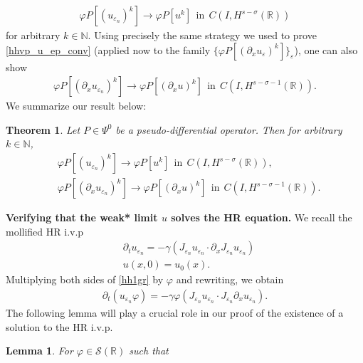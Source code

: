 \documentclass[12pt,reqno]{amsart}
\newcommand{\rr}{\mathbb{R}}
\newcommand{\p}{\partial}
\newcommand{\ee}{\varepsilon}
\newcommand{\vp}{\varphi}
\theoremstyle{plain}  %
\newtheorem{theorem}{Theorem}
\newtheorem{lemma}{Lemma}
\theoremstyle{definition}
\begin{document}
\begin{appendices}
\begin{equation}
\begin{split}
				\vp P [(u_{\ee_n})^k] \to \vp P [u^k] \ \ \text{in}  \ \ C(I,
				H^{s-\sigma}(\rr))
				\label{hhvp_u_ep_conv}
			\end{split}
		\end{equation}
		for arbitrary $k \in \mathbb{N}$.  Using precisely the same
		strategy we used to prove \eqref{hhvp_u_ep_conv} (applied now to
		the family $\{ \vp P [(\p_x u_{\ee})^k] \}_\ee$), one can also show
	\begin{equation}
			\begin{split}
			\vp P [ (\p_x u_{\ee_n})^k] \to \vp P [(\p_x u)^k] \ \ \text{in}  \ \ C(I,
				H^{s-\sigma -1 }(\rr)).
			\end{split}
		\end{equation}
		We summarize our result below:
		\begin{theorem}
		\label{hhthm:crit1}
		Let $P \in \Psi^0$ be a pseudo-differential operator. Then for
		arbitrary $k \in \mathbb{N}$, 
			\begin{equation}
			\begin{split}
				& \vp P [(u_{\ee_n})^k] \to \vp P [u^k] \ \ \text{in}  \ \ C(I,
				H^{s-\sigma }(\rr)),
				\\
				& 
				\vp P [(\p_x u_{\ee_n})^k] \to \vp P [(\p_x u)^k] \ \
				\text{in}  \ \ C(I,
				H^{s-\sigma -1}(\rr)).
				\label{hhdx_vp_u_ep_conv}
			\end{split}
		\end{equation}
	\end{theorem}
		\vskip0.1in
		{\bf Verifying that the weak* limit $u$ solves the HR equation.} 
		We recall the mollified HR i.v.p
		\begin{align}
			& \p_t u_{\ee_n}  = -\gamma(J_{\ee_n} u_{\ee_n} \cdot \p_x
			J_{\ee_n} u_{\ee_n})
			\label{hh1gr}
			\\
			& u(x,0) = u_0(x).
			\label{hh2gr}
		\end{align}
		Multiplying both sides of \eqref{hh1gr} by $\varphi$ and rewriting,
		we obtain
		\begin{equation}
			\label{hh3}
			\begin{split}
				\p_t(u_{\ee_n} \varphi) = -\gamma \vp (J_{\ee_n} u_{\ee_n} \cdot
				J_{\ee_n} \p_x u_{\ee_n}).
			\end{split}
		\end{equation}
		The following lemma will play a crucial role in our proof of the
		existence of a solution to the HR i.v.p.
		\begin{lemma}
			\label{hhlem:cc}
			For $\vp \in \mathcal{S}(\rr)$ such that

\end{lemma}
\end{appendices}
\end{document}
